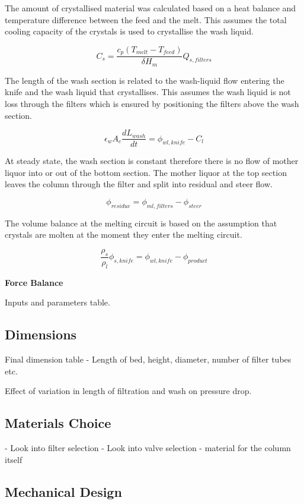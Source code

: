 The amount of crystallised material was calculated based on a heat balance and temperature difference between the feed and the melt. This assumes the total cooling capacity of the crystals is used to crystallise the wash liquid. 

\begin{equation}
C_s= \frac{c_p(T_{melt}-T_{feed})}{\delta H_m}Q_{s,filters}
\end{equation}

The length of the wash section is related to the wash-liquid flow entering the knife and the wash liquid that crystallises. This assumes the wash liquid is not loss through the filters which is ensured by positioning the filters above the wash section.

\begin{equation}
\epsilon_w A_c \frac{dL_{wash}}{dt}= \phi_{wl,knife}-C_l
\end{equation}

At steady state, the wash section is constant therefore there is no flow of mother liquor into or out of the bottom section. The mother liquor at the top section leaves the column through the filter and split into residual and steer flow. 

\begin{equation}
\phi_{residue}= \phi_{ml,filters} - \phi_{steer}
\end{equation}

The volume balance at the melting circuit is based on the assumption that crystals are molten at the moment they enter the melting circuit. 

\begin{equation}
\frac{\rho_s}{\rho_l}\phi_{s,knife}= \phi_{wl,knife} - \phi_{product}
\end{equation}

\textbf{Force Balance}














Inputs and parameters table. 

\subsection{Dimensions}
Final dimension table - Length of bed, height, diameter, number of filter tubes etc. 

Effect of variation in length of filtration and wash on pressure drop. 


\subsection{Materials Choice}
- Look into filter selection
- Look into valve selection 
- material for the column itself 

\subsection{Mechanical Design}

